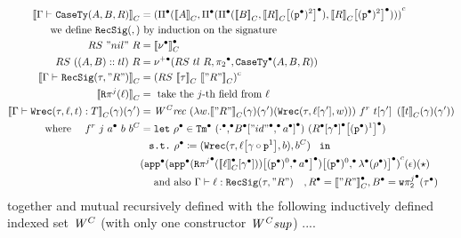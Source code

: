 \begin{align*}
  \denotesC{\goodType{\Gm}{\CaseSig{A}{B}{R}}{}} &= 
  \Gmodel{\GluedPi{\denotesC{A}}{\GluedPi {\GluedPi{\denotesC{B}}{\Gsub{\denotesC{R}}{\GSubstWeak{2}}}} {\Gsub{\denotesC{R}}{\GSubstWeak{2}}}}} \\
  \text{we define } \RecSig{}{} &\text{ by induction on the signature} \\
  RS~"nil"~R &= \denotesCC{\LSigEmp} \\
  RS~((A, B) :: tl)~R &= \GLSigAdd{RS~tl~R}{\Glued{\pi_2}}{\GCaseSig{A}{B}{R}} \\
  \denotesC{\goodType{\Gm}{\RecSig{\wsig}{"R"}}{}} &= \Gmodel{RS~\denotesC{\tau}~\denotesC{"R"}} \\
  \denotesC{\Recproj{j}{\lkg}} &= \text{ take the $j$-th field from } \lkg \\
  \denotesC{\goodTerm{\Gm}{\Wrec{\wsig}{\lkg}{t}}{T}}(\gm)(\gm') &= \CWrec~(\lambda w. \denotesC{"R"}(\gm)(\gm')(\Wrec{\wsig}{\sub{\lkg}{\gm'}}{w}))~f^r~\sub{t}{\gm'}~(\denotesC{t}(\gm)(\gm')) \\
  \text{ where } \quad f^r~j~\Glued{a}~b~b^C &= 
  \texttt{let}~\Glued{\rho}  \in \GTm{(\Glued{\cdot} \Glued{,} \Gsub{\Glued{B}}{\GSubstExt{\Glued{"id"}}{\Glued{a}}})}{(\Gsub{\Gsub{\Glued{R}}{\Glued{\gm}}}{\GSubstWeak{1}})} 
  \\
  & \ \texttt{ s.t.}~\Glued{\rho} \coloneq (\Wrec{\wsig}{\sub{\lkg}{\SubstComp{\gm}{\SubstWeak{1}}}}{b},b^C)~\texttt{ in } \\
  & \Gmodel{\Gsub{\Gapp{\Gsub{\Gapp{\GRecproj{j}{\sub{\denotesCC{\lkg}}{\Glued{\gm}}}}}{\GSubstExt{\GSubstId}{\Glued{a}}}}}{\GSubstExt{\GSubstId}{\Glam{\Glued{\rho}}}}}(\epsilon)(\star) \\
  & \quad 
   \text{ and also } \goodTerm{\Gm}{\lkg}{\RecSig{\wsig}{"R"}} \quad ,\Glued{R} = \denotesCC{"R"}, \Glued{B} = \Gwsigproj{j}{2}{\Glued{\wsig}}
\end{align*}
together and mutual recursively defined with the following inductively defined indexed set $\mathit{W}^C$ (with only one constructor $\mathit{W^Csup}$) ....


